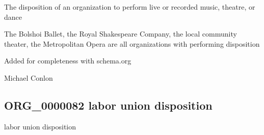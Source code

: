 \documentclass[letterpaper,10pt,english]{sphinxmanual}
\begin{document}
\begin{sphinxShadowBox}

\sphinxAtStartPar
{\hyperref[\detokenize{doc-BFO_0000016::doc}]{}}
\end{sphinxShadowBox}

\begin{sphinxShadowBox}

\sphinxAtStartPar
The disposition of an organization to perform live or recorded music, theatre, or dance
\end{sphinxShadowBox}

\begin{sphinxShadowBox}

\sphinxAtStartPar
{}
\end{sphinxShadowBox}

\begin{sphinxShadowBox}

\sphinxAtStartPar
The Bolshoi Ballet, the Royal Shakespeare Company, the local community theater, the Metropolitan Opera are all organizations with performing disposition
\end{sphinxShadowBox}

\begin{sphinxShadowBox}

\sphinxAtStartPar
Added for completeness with schema.org
\end{sphinxShadowBox}

\begin{sphinxShadowBox}

\sphinxAtStartPar
Michael Conlon 
\end{sphinxShadowBox}
\begin{quote}

\ignorespaces \end{quote}


\subsection{ORG\_0000082 \sphinxhyphen{} labor union disposition}
\label{\detokenize{doc-ORG_0000082:org-0000082-labor-union-disposition}}\label{\detokenize{doc-ORG_0000082:index-0}}\label{\detokenize{doc-ORG_0000082::doc}}
\begin{sphinxShadowBox}

\sphinxAtStartPar
labor union disposition
\end{sphinxShadowBox}
\end{document}
